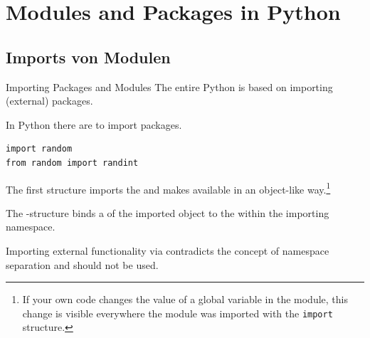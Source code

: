 \documentclass[12pt, aspectratio=169, usepdftitle=false]{beamer}
\newcommand{\pp}[1]{\lpl{#1}}
\begin{document}
\titlepage






\section{Modules and Packages in Python}


%		
%		
%		


\subsection{Imports von Modulen}

\begin{frame}[fragile]{Importing Packages and Modules}
        The entire Python  is based on importing (external) packages.

		\medskip
		
		In Python there are  to import packages.
		
		\medskip
		
		\begin{lstlisting}[language=pytiny]
import random
from random import randint
		\end{lstlisting}
		
		\medskip
		
		The first structure imports the  and makes  available in an object-like way.\footnote{If your own code changes the value of a global variable in the module, this change is visible everywhere the module was imported with the \texttt{import} structure.}
		
		\medskip
		
		The \pp{from}-structure binds a  of the imported object to the  within the importing namespace.
		
		\medskip
		
		Importing external functionality via  \pause contradicts the concept of namespace separation and should not be used.

\end{frame}
\end{document}
